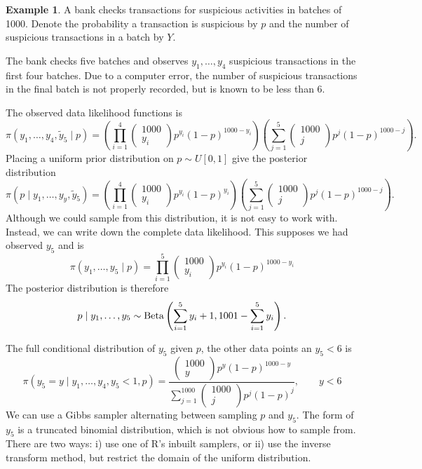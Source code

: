 \documentclass[
]{book}
\theoremstyle{definition}
\theoremstyle{definition}
\newtheorem{example}{Example}[chapter]
\theoremstyle{definition}
\theoremstyle{definition}
\theoremstyle{remark}
\begin{document}
\begin{example}
A bank checks transactions for suspicious activities in batches of 1000. Denote the probability a transaction is suspicious by \(p\) and the number of suspicious transactions in a batch by \(Y\).

The bank checks five batches and observes \(y_1, \ldots, y_4\) suspicious transactions in the first four batches. Due to a computer error, the number of suspicious transactions in the final batch is not properly recorded, but is known to be less than 6.

The observed data likelihood functions is
\[
\pi(y_1, \ldots, y_4, \tilde{y}_5 \mid p) = \left(\prod_{i=1}^4\begin{pmatrix} 1000 \\ y_i \end{pmatrix} p^{y_i}(1-p)^{1000 - y_i} \right)\left(\sum_{j=1}^5\begin{pmatrix} 1000 \\ j \end{pmatrix} p^{j}(1-p)^{1000 - j}\right).
\]
Placing a uniform prior distribution on \(p \sim U[0, 1]\) give the posterior distribution
\[
\pi(p \mid y_1, \ldots, y_y, \tilde{y}_5)= \left(\prod_{i=1}^4\begin{pmatrix} 1000 \\ y_i \end{pmatrix} p^{y_i}(1-p)^{y_i} \right)\left(\sum_{j=1}^5\begin{pmatrix} 1000 \\ j \end{pmatrix} p^{j}(1-p)^{1000 - j}\right).
\]
Although we could sample from this distribution, it is not easy to work with. Instead, we can write down the complete data likelihood. This supposes we had observed \(y_5\) and is
\[
\pi(y_1, \ldots, y_5 \mid p)  = \prod_{i=1}^5\begin{pmatrix} 1000 \\ y_i \end{pmatrix} p^{y_i}(1-p)^{1000 - y_i}
\]
The posterior distribution is therefore
\[
p \mid y_1, \ldots, y_5 \sim \hbox{Beta}\left(\sum_{i=1}^5 y_i + 1, 1001 - \sum_{i=1}^5 y_i\right).
\]

The full conditional distribution of \(y_5\) given \(p\), the other data points an \(y_5 < 6\) is
\[
  \pi(y_5 = y \mid y_1, \ldots, y_4, y_5 < 1, p) = \frac{\begin{pmatrix} 1000 \\ y \end{pmatrix} p^{y}(1-p)^{1000 - y}}{\sum_{j=1}^{1000}\begin{pmatrix} 1000 \\ j \end{pmatrix} p^{j}(1-p)^{j}}, \qquad y < 6
\]
We can use a Gibbs sampler alternating between sampling \(p\) and \(y_5\). The form of \(y_5\) is a truncated binomial distribution, which is not obvious how to sample from. There are two ways: i) use one of R's inbuilt samplers, or ii) use the inverse transform method, but restrict the domain of the uniform distribution.
\end{example}
\end{document}
